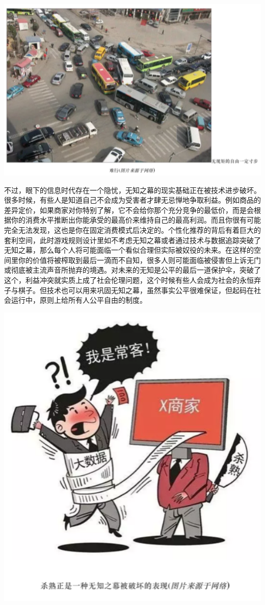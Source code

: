 \documentclass[]{book}
\begin{document}
\includegraphics[width=6.67in]{images/wuzhi2}

不过，眼下的信息时代存在一个隐忧，无知之幕的现实基础正在被技术进步破坏。很多时候，有些人是知道自己不会成为受害者才肆无忌惮地争取利益。例如商品的差异定价，如果商家对你特别了解，它不会给你那个充分竞争的最低价，而是会根据你的消费水平推断出你能承受的最高价来维持自己的最高利润。而且你很有可能完全无法发现，这也是你在固定消费模式后决定的。个性化推荐的背后有着巨大的套利空间，此时游戏规则设计里如不考虑无知之幕或者通过技术与数据追踪突破了无知之幕，那么每个人将可能面临一个看似合理但实际被奴役的未来。在这样的空间里你的价值将被榨取到最后一滴而不自知，很多人则可能面临被侵害但上诉无门或彻底被主流声音所抛弃的境遇。对未来的无知是公平的最后一道保护伞，突破了这个，利益冲突就实质上成了社会伦理问题，这个时候有些人会成为社会的永恒弃子与棋子。但技术也可以用来巩固无知之幕，虽然事实公平很难保证，但起码在社会运行中，原则上给所有人公平自由的制度。

\includegraphics[width=5.94in]{images/wuzhi3}
\end{document}
